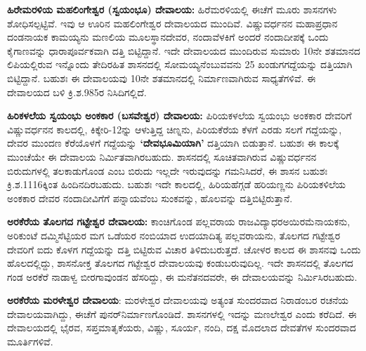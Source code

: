 \textbf{ಹಿರೇಮರಳಿಯ ಮಹಲಿಂಗೇಶ್ವರ (ಸ್ವಯಂಭೂ) ದೇವಾಲಯ:} ಹಿರೆಮರಳಿಯಲ್ಲಿ ಈಚೆಗೆ ಮೂರು ಶಾಸನಗಳು ಶೋಧಿಸಲ್ಪಟ್ಟಿವೆ. ಇವು ಆ ಊರಿನ ಮಹಲಿಂಗೇಶ್ವರ ದೇವಾಲಯದ ಮುಂದಿವೆ. ವಿಷ್ಣುವರ್ಧನನ ಮಹಾಪ್ರಧಾನ ದಂಡನಾಯಕ ಕಾಮಯ್ಯನು ಮಣಲಿಯ ಮೂಲಸ್ಥಾನದೇವರ, ನಂದಾವೆಳಕಿಗೆ ಅಂದರೆ ನಂದಾದೀಪಕ್ಕೆ ಒಂದು ಕೈಗಾಣವನ್ನು ಧಾರಾಪೂರ್ವಕವಾಗಿ ದತ್ತಿ ಬಿಟ್ಟಿದ್ದಾನೆ. ಇದೇ ದೇವಾಲಯದ ಮುಂದಿರುವ ಸುಮಾರು 10ನೇ ಶತಮಾನದ ಲಿಪಿಯಲ್ಲಿರುವ ಇನ್ನೊಂದು ತೇದಿರಹಿತ ಶಾಸನದಲ್ಲಿ ಸೋಮಯ್ಯನೆಂಬುವವನು 25 ಖಂಡುಗಗದ್ದೆಯನ್ನು ದತ್ತಿಯಾಗಿ ಬಿಟ್ಟಿದ್ದಾನೆ. ಬಹುಶಃ ಈ ದೇವಾಲಯವು 10ನೇ ಶತಮಾನದಲ್ಲಿ ನಿರ್ಮಾಣವಾಗಿರುವ ಸಾಧ್ಯತೆಗಳಿವೆ. ಈ ದೇವಾಲಯದ ಬಳಿ ಕ್ರಿ.ಶ.985ರ ನಿಸಿದಿಗಲ್ಲಿದೆ.

\textbf{ಹಿರಿಕಳಲೆಯ ಸ್ವಯಂಭು ಅಂಕಕಾರ (ಬಸವೇಶ್ವರ) ದೇವಾಲಯ:} ಪಿರಿಯಕಳಲೆಯ ಸ್ವಯಂಭು ಅಂಕಕಾರ ದೇವರಿಗೆ ವಿಷ್ಣುವರ್ಧನನ ಕಾಲದಲ್ಲಿ, ಕಿಕ್ಕೇರಿ-12ನ್ನು ಆಳುತ್ತಿದ್ದ ಚಿಣ್ನನು, ಪಿರಿಯಕೆರೆಯ ಕೆಳಗೆ ಎರಡು ಸಲಗೆ ಗದ್ದೆಯನ್ನು, ದೇವರ ಮುಂದಣ ಕೆರೆಯೊಳಗೆ ಗದ್ದೆಯನ್ನು \textbf{‘ದೇವಭೂಮಿಯಾಗಿ’} ದತ್ತಿಯಾಗಿ ಬಿಡುತ್ತಾನೆ. ಬಹುಶಃ ಈ ಕಾಲಕ್ಕೆ ಮುಂಚೆಯೇ ಈ ದೇವಾಲಯ ನಿರ್ಮಿತವಾಗಿರಬಹುದು. ಶಾಸನದಲ್ಲಿ ಸೂಚಿತವಾಗಿರುವ ವಿಷ್ಣುವರ್ಧನನ ಬಿರುದುಗಳಲ್ಲಿ ತಲಕಾಡುಗೊಂಡ ಎಂಬ ಬಿರುದು ಇಲ್ಲದೇ ಇರುವುದನ್ನು ಗಮನಿಸಿದರೆ, ಈ ಶಾಸನ ಬಹುಶಃ ಕ್ರಿ.ಶ.1116ಕ್ಕಿಂತ ಹಿಂದಿನದಿರಬಹುದು. ಬಹುಶಃ ಇದೇ ಕಾಲದಲ್ಲಿ, ಹಿರಿಯಹೆಗ್ಗಡೆ ಹರಿಯಣ್ಣನು ಪಿರಿಯಕಳಿಲೆಯ ಅಂಕಕಾರ ದೇವರ ನಂದಾದೀವಿಗೆಗೆ ಪನ್ನಾಯವೆಂಬ ಸುಂಕವನ್ನು, ಹೊಲವನ್ನು ದತ್ತಿಬಿಟ್ಟಿರುತ್ತಾನೆ.

\textbf{ಅರಕೆರೆಯ ತೊಲಗದ ಗಟ್ಟೇಶ್ವರ ದೇವಾಲಯ:} ಕಾಂಚಿಗೊಂಡ ಪಲ್ಲವರಾಯ ರಾಜವಿದ್ಯಾಧರ\break ಅಯಿರಮೆನಾಯಕನು, ಅರಿಕುಂಟೆ ದಮ್ಮಿಸೆಟ್ಟಿಯರ ಮಗ ಒಡೆಯರ ನಂಬಿಯಾದ ಉದಯಾದಿತ್ಯ ಪಲ್ಲವರಾಯನು, ತೊಲಗದ ಗಟ್ಟೇಶ್ವರ ದೇವರಿಗೆ ಐದು ಕೊಳಗ ಗದ್ದೆಯನ್ನು ದತ್ತಿ ಬಿಟ್ಟಿರುವ ವಿಚಾರ ತಿಳಿದುಬರುತ್ತದೆ. ಚೋಳರ ಕಾಲದ ಈ ಶಾಸನವು ಒಂದು ಹೊಲದಲ್ಲಿದ್ದು, ಶಾಸನೋಕ್ತ ತೊಲಗದ ಗಟ್ಟೇಶ್ವರ ದೇವಾಲಯವು ಕಂಡುಬರುವುದಿಲ್ಲ. ಇದೇ ಶಾಸನದಲ್ಲಿ ತೊಲಗದ ಗಂಡ ಅರಕೆರೆ ನಾಡಾಳ್ವ ಬೀರಗಾವುಂಡನ ಹೆಸರಿದ್ದು, ಈ ಮನೆತನದವರೇ, ಈ ದೇವಾಲಯವನ್ನು ನಿರ್ಮಿಸಿರಬಹುದು.

\textbf{ಅರಕೆರೆಯ ಮರಳೇಶ್ವರ ದೇವಾಲಯ}: ಮರಳೇಶ್ವರ ದೇವಾಲಯವು ಅತ್ಯಂತ ಸುಂದರವಾದ ನಿರಾಡಂಬರ ರಚನೆಯ ದೇವಾಲಯವಾಗಿದ್ದು, ಈಚೆಗೆ ಪುನರ್​ನಿರ್ಮಾಣಗೊಂಡಿದೆ. ಶಾಸನಗಳಲ್ಲಿ ಇದನ್ನು ಮಣಲೇಶ್ವರ ಎಂದು ಕರೆದಿದೆ. ಈ ದೇವಾಲಯದಲ್ಲಿ ಭೈರವ, ಸಪ್ತಮಾತೃಕೆಯರು, ವಿಷ್ಣು, ಸೂರ್ಯ, ನಂದಿ, ದಕ್ಷ ಮೊದಲಾದ ದೇವತೆಗಳ ಸುಂದರವಾದ ಮೂರ್ತಿಗಳಿವೆ.


